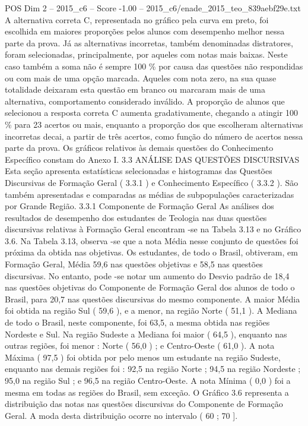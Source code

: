 \begin{textsample}{POS Dim 2 – 2015\_c6 – Score -1.00 – 2015\_c6/enade\_2015\_teo\_839aebf29e.txt}
A alternativa correta C, representada no gráfico pela curva em preto, foi escolhida em maiores proporções pelos alunos com desempenho melhor nessa parte da prova.
Já as alternativas incorretas, também denominadas distratores, foram selecionadas, principalmente, por aqueles com notas mais baixas.
Neste caso também a soma não é sempre 100 \% por causa das questões não respondidas ou com mais de uma opção marcada.
Aqueles com nota zero, na sua quase totalidade deixaram esta questão em branco ou marcaram mais de uma alternativa, comportamento considerado inválido.
A proporção de alunos que selecionou a resposta correta C aumenta gradativamente, chegando a atingir 100 \% para 23 acertos ou mais, enquanto a proporção dos que escolheram alternativas incorretas decai, a partir de três acertos, como função do número de acertos nessa parte da prova.
Os gráficos relativos às demais questões do Conhecimento Específico constam do Anexo I. 3.3 ANÁLISE DAS QUESTÕES DISCURSIVAS Esta seção apresenta estatísticas selecionadas e histogramas das Questões Discursivas de Formação Geral ( 3.3.1 ) e Conhecimento Específico ( 3.3.2 ).
São também apresentadas e comparadas as médias de subpopulações caracterizadas por Grande Região. 3.3.1 Componente de Formação Geral As análises dos resultados de desempenho dos estudantes de Teologia nas duas questões discursivas relativas à Formação Geral encontram -se na Tabela 3.13 e no Gráfico 3.6.
Na Tabela 3.13, observa -se que a nota Média nesse conjunto de questões foi próxima da obtida nas objetivas.
Os estudantes, de todo o Brasil, obtiveram, em Formação Geral, Média 59,6 nas questões objetivas e 58,5 nas questões discursivas.
No entanto, pode -se notar um aumento do Desvio padrão de 18,4 nas questões objetivas do Componente de Formação Geral dos alunos de todo o Brasil, para 20,7 nas questões discursivas do mesmo componente.
A maior Média foi obtida na região Sul ( 59,6 ), e a menor, na região Norte ( 51,1 ).
A Mediana de todo o Brasil, neste componente, foi 63,5, a mesma obtida nas regiões Nordeste e Sul.
Na região Sudeste a Mediana foi maior ( 64,5 ), enquanto nas outras regiões, foi menor : Norte ( 56,0 ) ; e Centro-Oeste ( 61,0 ).
A nota Máxima ( 97,5 ) foi obtida por pelo menos um estudante na região Sudeste, enquanto nas demais regiões foi : 92,5 na região Norte ; 94,5 na região Nordeste ; 95,0 na região Sul ; e 96,5 na região Centro-Oeste.
A nota Mínima ( 0,0 ) foi a mesma em todas as regiões do Brasil, sem exceção.
O Gráfico 3.6 representa a distribuição das notas nas questões discursivas do Componente de Formação Geral.
A moda desta distribuição ocorre no intervalo ( 60 ; 70 ].

\end{textsample}

